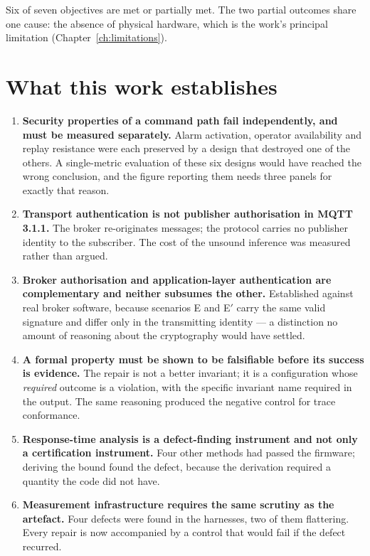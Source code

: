 Six of seven objectives are met or partially met. The two partial outcomes share one cause: the
absence of physical hardware, which is the work's principal limitation
(Chapter~\ref{ch:limitations}).

\section{What this work establishes}

\begin{enumerate}[leftmargin=2.0em,itemsep=4pt]
  \item \textbf{Security properties of a command path fail independently, and must be measured
        separately.} Alarm activation, operator availability and replay resistance were each
        preserved by a design that destroyed one of the others. A single-metric evaluation of
        these six designs would have reached the wrong conclusion, and the figure reporting them
        needs three panels for exactly that reason.
  \item \textbf{Transport authentication is not publisher authorisation in MQTT 3.1.1.} The
        broker re-originates messages; the protocol carries no publisher identity to the
        subscriber. The cost of the unsound inference was measured rather than argued.
  \item \textbf{Broker authorisation and application-layer authentication are complementary and
        neither subsumes the other.} Established against real broker software, because scenarios
        E and E$'$ carry the same valid signature and differ only in the transmitting identity
        --- a distinction no amount of reasoning about the cryptography would have settled.
  \item \textbf{A formal property must be shown to be falsifiable before its success is
        evidence.} The repair is not a better invariant; it is a configuration whose
        \emph{required} outcome is a violation, with the specific invariant name required in the
        output. The same reasoning produced the negative control for trace conformance.
  \item \textbf{Response-time analysis is a defect-finding instrument and not only a
        certification instrument.} Four other methods had passed the firmware; deriving the bound
        found the defect, because the derivation required a quantity the code did not have.
  \item \textbf{Measurement infrastructure requires the same scrutiny as the artefact.} Four
        defects were found in the harnesses, two of them flattering. Every repair is now
        accompanied by a control that would fail if the defect recurred.
\end{enumerate}

